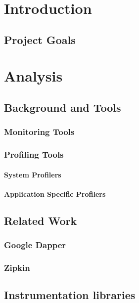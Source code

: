 \documentclass[12pt,a4paper]{report}
\begin{document}



\tableofcontents

\chapter{Introduction}
\section{Project Goals}

\chapter{Analysis}
\section{Background and Tools }
\subsection{Monitoring Tools}
\subsection{Profiling Tools}
\subsubsection{System Profilers}
\subsubsection{Application Specific Profilers}
\section{Related Work}
\subsection{Google Dapper}
\subsection{Zipkin}
\section{Instrumentation libraries}
\end{document}
